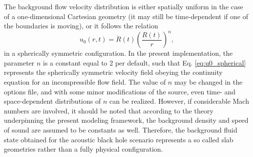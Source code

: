 The background flow velocity distribution is either spatially uniform in the case of a one-dimensional Cartesian geometry (it may still be time-dependent if one of the boundaries is moving), or it follows the relation
\begin{equation}
u_0\left(r,t\right) = \dot R\left(t\right)\left(\dfrac{R\left(t\right)}{r}\right)^n,
\label{eq:u0_spherical}
\end{equation}
in a spherically symmetric configuration. In the present implementation, the parameter $n$ is a constant equal to 2 per default, such that Eq. \eqref{eq:u0_spherical} represents the spherically symmetric velocity field obeying the continuity equation for an incompressible flow field. The value of $n$ may be changed in the options file, and with some minor modifications of the source, even time- and space-dependent distributions of $n$ can be realized. However, if considerable Mach numbers are involved, it should be noted that according to the theory underpinning the present modeling framework, the background density and speed of sound are assumed to be constants as well. Therefore, the background fluid state obtained for the acoustic black hole scenario represents a so called slab geometries rather than a fully physical configuration.



